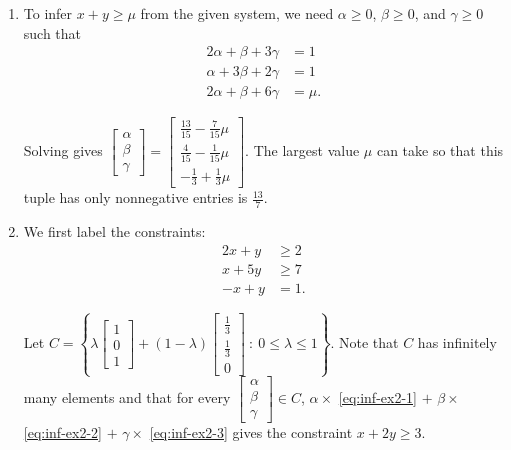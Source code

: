 \documentclass[]{book}
\providecommand{\tightlist}{%
  \setlength{\itemsep}{0pt}\setlength{\parskip}{0pt}}
\newcommand{\ssep}{~:~}
\theoremstyle{definition}
\theoremstyle{definition}
\theoremstyle{remark}
\begin{document}
\begin{enumerate}
\def\labelenumi{\arabic{enumi}.}
\tightlist
\item
  To infer \(x + y \geq \mu\) from the given system, we need
  \(\alpha \geq 0\), \(\beta \geq 0\), and \(\gamma \geq 0\) such that
  \begin{align*}
    2\alpha + \beta + 3\gamma & = 1\\
     \alpha + 3\beta + 2\gamma & = 1\\
    2\alpha + \beta + 6\gamma & = \mu.
  \end{align*}

  Solving gives
  \(\begin{bmatrix} \alpha \\ \beta \\ \gamma\end{bmatrix} = \begin{bmatrix} \frac{13}{15} - \frac{7}{15} \mu \\ \frac{4}{15}-\frac{1}{15} \mu \\ -\frac{1}{3} + \frac{1}{3}\mu\end{bmatrix}\).
  The largest value \(\mu\) can take so that this tuple has only
  nonnegative entries is \(\frac{13}{7}\).
\item
  We first label the constraints:
  \begin{align}
  2x + y & \geq 2 \label{eq:inf-ex2-1} \\
  x + 5y & \geq 7 \label{eq:inf-ex2-2} \\
  -x + y & = 1.  \label{eq:inf-ex2-3}
  \end{align}

  Let
  \(C = \left \{ \lambda \begin{bmatrix} 1 \\ 0 \\ 1\end{bmatrix} + (1-\lambda)\begin{bmatrix} \frac{1}{3} \\ \frac{1}{3} \\ 0 \end{bmatrix} \ssep 0 \leq \lambda \leq 1 \right\}\).
  Note that \(C\) has infinitely many elements and that for every
  \(\begin{bmatrix} \alpha \\ \beta \\ \gamma\end{bmatrix} \in C\),
  \(\alpha \times\) \eqref{eq:inf-ex2-1} \(+\) \(\beta \times\)
  \eqref{eq:inf-ex2-2} \(+\) \(\gamma \times\) \eqref{eq:inf-ex2-3} gives
  the constraint \(x + 2y \geq 3\).


\end{enumerate}
\end{document}
